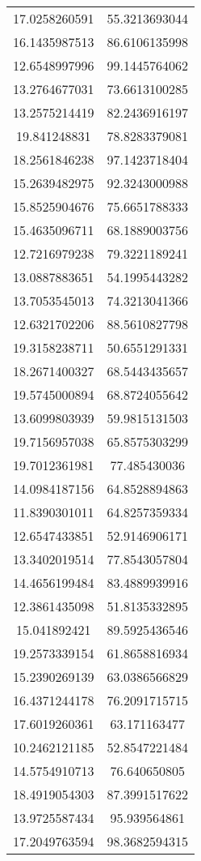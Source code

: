 \begin{table}
\begin{tabular}{cc}
17.0258260591 & 55.3213693044 \\
16.1435987513 & 86.6106135998 \\
12.6548997996 & 99.1445764062 \\
13.2764677031 & 73.6613100285 \\
13.2575214419 & 82.2436916197 \\
19.841248831 & 78.8283379081 \\
18.2561846238 & 97.1423718404 \\
15.2639482975 & 92.3243000988 \\
15.8525904676 & 75.6651788333 \\
15.4635096711 & 68.1889003756 \\
12.7216979238 & 79.3221189241 \\
13.0887883651 & 54.1995443282 \\
13.7053545013 & 74.3213041366 \\
12.6321702206 & 88.5610827798 \\
19.3158238711 & 50.6551291331 \\
18.2671400327 & 68.5443435657 \\
19.5745000894 & 68.8724055642 \\
13.6099803939 & 59.9815131503 \\
19.7156957038 & 65.8575303299 \\
19.7012361981 & 77.485430036 \\
14.0984187156 & 64.8528894863 \\
11.8390301011 & 64.8257359334 \\
12.6547433851 & 52.9146906171 \\
13.3402019514 & 77.8543057804 \\
14.4656199484 & 83.4889939916 \\
12.3861435098 & 51.8135332895 \\
15.041892421 & 89.5925436546 \\
19.2573339154 & 61.8658816934 \\
15.2390269139 & 63.0386566829 \\
16.4371244178 & 76.2091715715 \\
17.6019260361 & 63.171163477 \\
10.2462121185 & 52.8547221484 \\
14.5754910713 & 76.640650805 \\
18.4919054303 & 87.3991517622 \\
13.9725587434 & 95.939564861 \\
17.2049763594 & 98.3682594315 \\

\end{tabular}
\end{table}
